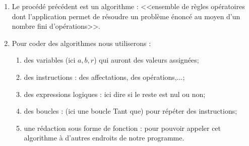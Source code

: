 \documentclass[10pt,fleqn]{article} %
\begin{document}
\begin{rem}
\begin{enumerate}
\item Le procédé précédent est un algorithme : <<ensemble de règles opératoires dont l'application permet de résoudre un problème énoncé au moyen d'un nombre fini d'opérations>>.
\item Pour coder des algorithmes nous utiliserons :
\begin{enumerate}
\item des variables (ici $a,b,r$) qui auront des valeurs assignées;
\item des instructions : des affectations, des opérations,...;
\item des expressions logiques : ici dire si le reste est nul ou non;
\item des boucles : (ici une boucle Tant que) pour répéter des instructions;
\item une rédaction sous forme de fonction : pour pouvoir appeler cet algorithme à d'autres endroits de notre programme.
\end{enumerate}
\end{enumerate}
\end{rem}
\end{document}
